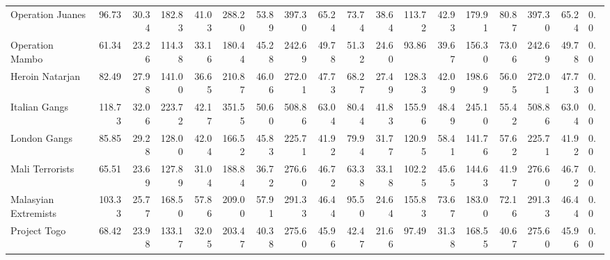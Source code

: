 \begin{tabular}{lrrrrrrrrrrrrrrrrl}
Operation Juanes     &             96.73 &  30.34 &  182.83 &  41.03 &  288.20 &  53.89 &  397.30 &  65.24 &            73.74 &   38.64 &  113.72 &   42.93 &  179.91 &   80.87 &  397.30 &  65.24 &        0.0 \\
Operation Mambo      &             61.34 &  23.26 &  114.38 &  33.16 &  180.44 &  45.28 &  242.69 &  49.78 &            51.32 &   24.60 &   93.86 &   39.67 &  156.30 &   73.06 &  242.69 &  49.78 &        0.0 \\
Heroin Natarjan      &             82.49 &  27.98 &  141.00 &  36.65 &  210.87 &  46.06 &  272.01 &  47.73 &            68.27 &   27.49 &  128.33 &   42.09 &  198.69 &   56.05 &  272.01 &  47.73 &        0.0 \\
Italian Gangs        &            118.73 &  32.06 &  223.72 &  42.17 &  351.55 &  50.60 &  508.86 &  63.04 &            80.44 &   41.83 &  155.96 &   48.49 &  245.10 &   55.42 &  508.86 &  63.04 &        0.0 \\
London Gangs         &             85.85 &  29.28 &  128.00 &  42.04 &  166.52 &  45.83 &  225.71 &  41.92 &            79.94 &   31.77 &  120.95 &   58.41 &  141.76 &   57.62 &  225.71 &  41.92 &        0.0 \\
Mali Terrorists      &             65.51 &  23.69 &  127.89 &  31.04 &  188.84 &  36.72 &  276.60 &  46.72 &            63.38 &   33.18 &  102.25 &   45.65 &  144.63 &   41.97 &  276.60 &  46.72 &        0.0 \\
Malasyian Extremists &            103.33 &  25.77 &  168.50 &  57.86 &  209.00 &  57.91 &  291.33 &  46.44 &            95.50 &   24.64 &  155.83 &   73.67 &  183.00 &   72.16 &  291.33 &  46.44 &        0.0 \\
Project Togo         &             68.42 &  23.98 &  133.17 &  32.05 &  203.47 &  40.38 &  275.60 &  45.96 &            42.47 &   21.66 &   97.49 &   31.38 &  168.55 &   40.67 &  275.60 &  45.96 &        0.0 \\
\bottomrule
\end{tabular}
